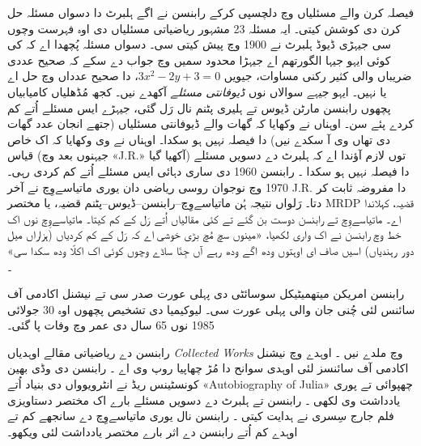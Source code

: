 \documentclass[../../../include/open-logic-section]{subfiles}
\begin{document}
فیصلہ کرن والے مسئلیاں وچ دلچسپی کرکے رابنسن نے اگے ہلبرٹ دا دسواں مسئلہ حل کرن دی کوشش کیتی۔ ایہ مسئلہ 23 مشہور ریاضیاتی مسئلیاں دی اوہ فہرست وچوں سی جیہڑی ڈیوڈ ہلبرٹ نے 1900 وچ پیش کیتی سی۔ دسواں مسئلہ پُچھدا اے کہ کی کوئی ایہو جیہا الگورتھم اے جیہڑا محدود سمیں وچ جواب دے سکے کہ صحیح عددی ضریباں والی کثیر رکنی مساوات، جیویں $3x^2 - 2y +3 = 0$، دا صحیح عدداں وچ حل اے یا نہیں۔ ایہو جیہے سوالاں نوں \emph{ڈیوفانتی مسئلے} آکھدے نیں۔ کجھ مُڈھلیاں کامیابیاں پچھوں رابنسن مارٹن ڈیوس تے ہلیری پٹنم نال رَل گئی، جیہڑے ایس مسئلے اُتے کم کردے پئے سن۔ اوہناں نے وکھایا کہ گھات والے ڈیوفانتی مسئلیاں (جتھے انجان عدد گھات دی تھاں وی آ سکدے نیں) دا فیصلہ نہیں ہو سکدا۔ اوہناں نے وی وکھایا کہ اک خاص قیاس (جیہنوں بعد وچ «J.R.» آکھیا گیا) توں لازم آؤندا اے کہ ہلبرٹ دے دسویں مسئلے دا فیصلہ نہیں ہو سکدا \citep{DavisPutnamRobinson1961}۔ رابنسن 1960 دی ساری دہائی ایس مسئلے اُتے کم کردی رہی۔ 1970 وچ نوجوان روسی ریاضی دان یوری ماتیاسےوِچ نے آخر J.R. دا مفروضہ ثابت کر دتا۔ رَلواں نتیجہ ہُن ماتیاسےوِچ–رابنسن–ڈیوس–پٹنم قضیہ، یا مختصر MRDP قضیہ، کہلاندا اے۔ ماتیاسےوِچ تے رابنسن دوست بن گئے تے کئی مقالیاں اُتے رَل کے کم کیتا۔ ماتیاسےوِچ نوں اک خط وچ رابنسن نے اک واری لکھیا، «مینوں سچ مُچ بڑی خوشی اے کہ رَل کے کم کردیاں (ہزاراں میل دور رہندیاں) اسیں صاف ای اوہتوں ودھ اگے ودھ رہے آں جِنّا ساڈے وچوں کوئی اک اکلّا ودھ سکدا سی» \citep[45]{Matijasevich1992}۔

رابنسن امریکن میتھمیٹیکل سوسائٹی دی پہلی عورت صدر سی تے نیشنل اکادمی آف سائنس لئی چُنی جان والی پہلی عورت سی۔ لیوکیمیا دی تشخیص پچھوں اوہ 30 جولائی 1985 نوں 65 سال دی عمر وچ وفات پا گئی۔

\begin{reading}
رابنسن دے ریاضیاتی مقالے اوہدیاں \textit{Collected
  Works} وچ ملدے نیں \citep{Robinson1996}۔ اوہدے وچ نیشنل اکادمی آف سائنسز لئی اوہدی سوانح دا مُڑ چھاپیا روپ وی اے \citep{Feferman1994}۔ رابنسن دی وڈی بھین کونسٹینس ریڈ نے انٹرویوواں دی بنیاد اُتے «Autobiography of Julia» چھپوائی \citep{Reid1986} تے پوری یادداشت وی لکھی \citep{Reid1996}۔ رابنسن تے ہلبرٹ دے دسویں مسئلے بارے اک مختصر دستاویزی فلم جارج سِسری نے ہدایت کیتی \citep{Csicsery2016}۔ رابنسن نال یوری ماتیاسےوِچ دے سانجھے کم تے اوہدے کم اُتے رابنسن دے اثر بارے مختصر یادداشت لئی \citep{Matijasevich1992} ویکھو۔
\end{reading}
\end{document}
